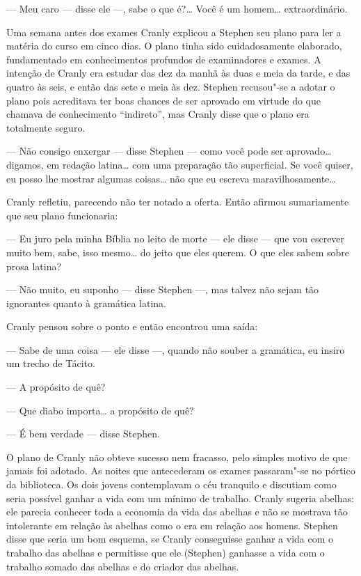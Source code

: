 --- Meu caro --- disse ele ---, sabe o que é?\ldots{}  Você é um homem\ldots{}
extraordinário.

Uma semana antes dos exames Cranly explicou a Stephen seu plano para ler a
\label{materia"-do} matéria do curso em cinco dias.  O plano tinha sido cuidadosamente elaborado,
fundamentado em conhecimentos profundos de examinadores e exames.  A intenção
de Cranly era estudar das dez da manhã às duas e meia da tarde, e das quatro às
seis, e então das sete e meia às dez.  Stephen recusou"-se a adotar o plano pois
acreditava ter boas chances de ser aprovado em virtude do que chamava de
conhecimento “indireto”, mas Cranly disse que o plano era totalmente seguro.

--- Não consigo enxergar --- disse Stephen --- como você pode ser aprovado\ldots{}
digamos, em redação latina\ldots{} com uma preparação tão superficial.  Se você
quiser, eu posso lhe mostrar algumas coisas\ldots{}  não que eu escreva
maravilhosamente\ldots{}

Cranly refletiu, parecendo não ter notado a oferta.  Então afirmou sumariamente
que seu plano funcionaria:

--- Eu juro pela minha Bíblia no leito de morte --- ele disse --- que vou
escrever muito bem, sabe, isso mesmo\ldots{} do jeito que eles querem.  O que eles
sabem sobre prosa latina?

--- Não muito, eu suponho --- disse Stephen ---, mas talvez não sejam tão
ignorantes quanto à gramática latina.

Cranly pensou sobre o ponto e então encontrou uma saída:

--- Sabe de uma coisa --- ele disse ---, quando não souber a gramática, eu
insiro um trecho de Tácito.

--- A propósito de quê?

--- Que diabo importa\ldots{} a propósito de quê?

--- É bem verdade --- disse Stephen.

O plano de Cranly não obteve sucesso nem fracasso, pelo simples motivo de que
jamais foi adotado.  As noites que antecederam os exames passaram"-se no pórtico
da biblioteca.  Os dois jovens contemplavam o céu tranquilo e discutiam como
seria possível ganhar a vida com um mínimo de trabalho.  Cranly sugeria
abelhas: ele parecia conhecer toda a economia da vida das abelhas e não se
mostrava tão intolerante em relação às abelhas como o era em relação aos
homens.  Stephen disse que seria um bom esquema, se Cranly conseguisse ganhar a
vida com o trabalho das abelhas e permitisse que ele (Stephen) ganhasse a vida
com o trabalho somado das abelhas e do criador das abelhas.

